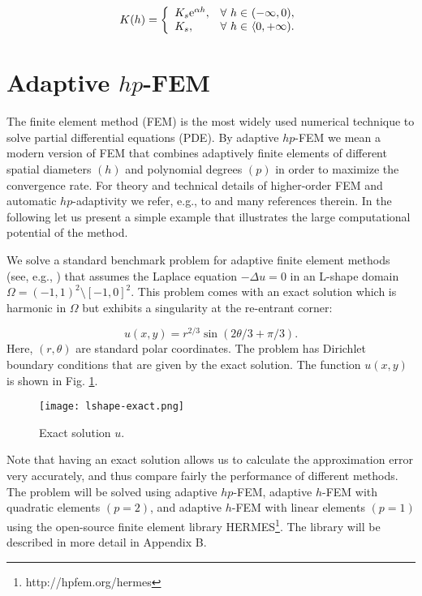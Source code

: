 \documentclass[final,3p,times,twocolumn]{elsarticle}
\begin{document}
  \begin{equation}
  \label{gardner-K}
  K(h) = \left\{
    \begin{array}{l l}
    K_s \textrm{e}^{\alpha h},  &  \mbox{$\forall$  $h \in$ $(-\infty,0)$},\\
    K_s, & \mbox{$\forall$   $h \in$ $\langle 0, +\infty)$}.
    \end{array} \right.
    \end{equation}




\section{Adaptive $hp$-FEM}
\label{sec:hpfem}

The finite element method (FEM) is the most widely used numerical technique
to solve partial differential equations (PDE). 
By adaptive $hp$-FEM we mean a modern version of FEM that combines
adaptively finite elements of different spatial diameters $(h)$ and polynomial
degrees $(p)$ in order to maximize the convergence rate.
For theory and technical details of higher-order FEM
and automatic $hp$-adaptivity we refer, e.g., to \cite{sosedo} 
and many references therein. In the following let us present
a simple example that illustrates the large computational potential of 
the method. 

We solve a standard benchmark problem for adaptive finite element 
methods (see, e.g., \cite{sode}) that 
assumes the Laplace equation $-\Delta u = 0$ in an L-shape domain
$\Omega = (-1, 1)^2 \setminus [-1, 0]^2$. This problem comes with an exact 
solution which is harmonic in $\Omega$ but exhibits a singularity at the 
re-entrant corner:

$$
u(x,y) = r^{2/3} \sin(2 \theta / 3 + \pi / 3).
$$
Here, $(r, \theta)$ are standard polar coordinates. The problem has 
Dirichlet boundary conditions that are given by the exact solution. 
The function $u(x, y)$ is shown in Fig. \ref{fig:lshape-exact}. 


\begin{figure}[!ht]
\begin{center}
\texttt{[image: lshape-exact.png]}
\end{center}
\vspace{-4mm}
\caption{Exact solution $u$.}
\label{fig:lshape-exact}
\end{figure}

Note that having an exact solution allows us to calculate the approximation 
error very accurately, and thus compare fairly the performance of different methods. 
The problem will be solved using adaptive $hp$-FEM, adaptive $h$-FEM with 
quadratic elements $(p = 2)$, and adaptive $h$-FEM with linear elements $(p = 1)$
using the open-source finite element library HERMES\footnote{http://hpfem.org/hermes}. 
The library will be described in more detail in Appendix B. 
\end{document}
